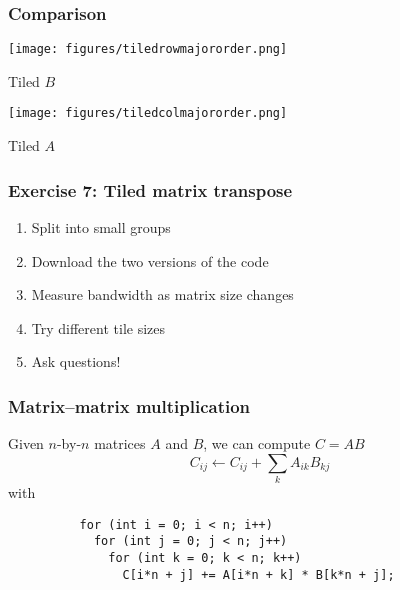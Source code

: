 \documentclass[dvipsnames,presentation,aspectratio=169,14pt]{beamer}
\begin{document}
\begin{frame}
  \frametitle{Comparison }
  \begin{center}
    \begin{minipage}[t][\parskip][t]{0.4\textwidth}
      \texttt{[image: figures/tiledrowmajororder.png]}
      \centering

      Tiled $B$
    \end{minipage}
    \qquad
    \begin{minipage}[t][\parskip][t]{0.4\textwidth}
      \texttt{[image: figures/tiledcolmajororder.png]}
      \centering

      Tiled $A$
    \end{minipage}
  \end{center}
\end{frame}

\begin{frame}
  \frametitle{Exercise 7: Tiled matrix transpose}
  \begin{enumerate}[itemsep=8pt]
  \item Split into small groups
  \item Download the two versions of the code
  \item Measure bandwidth as matrix size changes
  \item Try different tile sizes
  \item Ask questions!
  \end{enumerate}
\end{frame}

\begin{frame}[fragile]
  \frametitle{Matrix--matrix multiplication}
  Given $n$-by-$n$ matrices $A$ and $B$, we can compute $C = AB$
  \begin{equation*}
    C_{ij} \gets C_{ij } + \sum_k A_{ik} B_{kj}
  \end{equation*}
  with
\begin{verbatim}
          for (int i = 0; i < n; i++)
            for (int j = 0; j < n; j++)
              for (int k = 0; k < n; k++)
                C[i*n + j] += A[i*n + k] * B[k*n + j];
\end{verbatim}

\end{frame}
\end{document}
